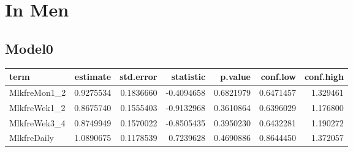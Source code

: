 \documentclass[]{article}
\newenvironment{Shaded}{\begin{snugshade}}{\end{snugshade}}
\newcommand{\CommentTok}[1]{\textcolor[rgb]{0.56,0.35,0.01}{\textit{#1}}}
\newcommand{\DataTypeTok}[1]{\textcolor[rgb]{0.13,0.29,0.53}{#1}}
\newcommand{\KeywordTok}[1]{\textcolor[rgb]{0.13,0.29,0.53}{\textbf{#1}}}
\newcommand{\NormalTok}[1]{#1}
\newcommand{\OperatorTok}[1]{\textcolor[rgb]{0.81,0.36,0.00}{\textbf{#1}}}
\newcommand{\OtherTok}[1]{\textcolor[rgb]{0.56,0.35,0.01}{#1}}
\newcommand{\StringTok}[1]{\textcolor[rgb]{0.31,0.60,0.02}{#1}}
\begin{document}
\begin{Shaded}
\end{Shaded}

\hypertarget{in-men-4}{%
\section{In Men}\label{in-men-4}}

\hypertarget{model0-8}{%
\subsection{Model0}\label{model0-8}}

\begin{Shaded}
\end{Shaded}

\begin{longtable}[]{@{}lrrrrrr@{}}
\toprule
term & estimate & std.error & statistic & p.value & conf.low &
conf.high\tabularnewline
\midrule
\endhead
MlkfreMon1\_2 & 0.9275534 & 0.1836660 & -0.4094658 & 0.6821979 &
0.6471457 & 1.329461\tabularnewline
MlkfreWek1\_2 & 0.8675740 & 0.1555403 & -0.9132968 & 0.3610864 &
0.6396029 & 1.176800\tabularnewline
MlkfreWek3\_4 & 0.8749949 & 0.1570022 & -0.8505435 & 0.3950230 &
0.6432281 & 1.190272\tabularnewline
MlkfreDaily & 1.0890675 & 0.1178539 & 0.7239628 & 0.4690886 & 0.8644450
& 1.372057\tabularnewline
\bottomrule
\end{longtable}
\end{document}

